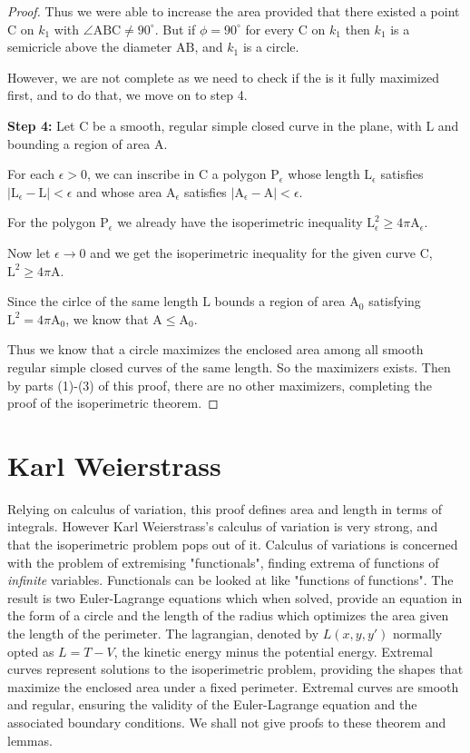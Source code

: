 \documentclass[a4paper]{book}
\numberwithin{theorem}{section}%
\begin{document}
\begin{proof}
    Thus we were able to increase the area provided that there existed a point $\mathrm{C}$ on $k_{1}$ with $\angle\mathrm{ABC}\neq90^{\circ}$. But if $\phi=90^{\circ}$ for every $\mathrm{C}$ on $k_{1}$ then $k_{1}$ is a semicricle above the diameter $\mathrm{AB}$, and $k_{1}$ is a circle. 

    However, we are not complete as we need to check if the is it fully maximized first, and to do that, we move on to step 4.

    \textbf{Step 4:} Let $\mathrm{C}$ be a smooth, regular simple closed curve in the plane, with $\mathrm{L}$ and bounding a region of area $\mathrm{A}$.

    For each $\epsilon>0$, we can inscribe in $\mathrm{C}$ a polygon $\mathrm{P}_{\epsilon}$ whose length $\mathrm{L}_{\epsilon}$ satisfies $|\mathrm{L}_{\epsilon}-\mathrm{L}|<\epsilon$ and whose area $\mathrm{A}_{\epsilon}$ satisfies $|\mathrm{A}_{\epsilon}-\mathrm{A}|<\epsilon$.

    For the polygon $\mathrm{P}_{\epsilon}$ we already have the isoperimetric inequality $\mathrm{L}_{\epsilon}^{2}\geq4\pi\mathrm{A}_{\epsilon}$.

    Now let $\epsilon\to0$ and we get the isoperimetric inequality for the given curve $\mathrm{C}$, $\mathrm{L}^{2}\geq4\pi\mathrm{A}$.

    Since the cirlce of the same length $\mathrm{L}$ bounds a region of area $\mathrm{A}_{0}$ satisfying $\mathrm{L}^{2}=4\pi\mathrm{A}_{0}$, we know that $\mathrm{A}\leq\mathrm{A}_{0}$.

    Thus we know that a circle maximizes the enclosed area among all smooth regular simple closed curves of the same length. So the maximizers exists. Then by parts (1)-(3) of this proof, there are no other maximizers, completing the proof of the isoperimetric theorem.
\end{proof}

\section{Karl Weierstrass}
Relying on calculus of variation, this proof defines area and length in terms of integrals. However Karl Weierstrass's calculus of variation is very strong, and that the isoperimetric problem pops out of it. Calculus of variations is concerned with the problem of extremising "functionals", finding extrema of functions of \textit{infinite} variables. Functionals can be looked at like "functions of functions". The result is two Euler-Lagrange equations which when solved, provide an equation in the form of a circle and the length of the radius which optimizes the area given the length of the perimeter. The lagrangian, denoted by $L(x,y,y')$ normally opted as $L=T-V$, the kinetic energy minus the potential energy. Extremal curves represent solutions to the isoperimetric problem, providing the shapes that maximize the enclosed area under a fixed perimeter. Extremal curves are smooth and regular, ensuring the validity of the Euler-Lagrange equation and the associated boundary conditions. We shall not give proofs to these theorem and lemmas.
\end{document}
